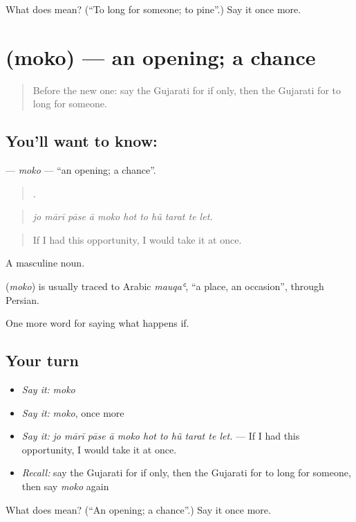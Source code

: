 \begin{tcolorbox}[breakable,colback=teal!4,colframe=teal!35!black,title={Before you move on}]
What does  mean? (\textquotedblleft{}To long for someone; to pine\textquotedblright{}.) Say it once more.
\end{tcolorbox}
\section[\texorpdfstring{\gu{મોકો} (moko)}{મોકો (moko)}]{ (moko) — an opening; a chance}

\label{lesson:GU-C381-moko}



\begin{quote}
Before the new one: say the Gujarati for if only, then the Gujarati for to long for someone.
\end{quote}

\subsection*{You'll want to know: }
\textbf{} — \emph{moko} — \textquotedblleft{}an opening; a chance\textquotedblright{}.

\begin{quote}
          .
\end{quote}

\begin{quote}
\emph{jo mārī pāse ā moko hot to hũ tarat te let.}
\end{quote}

\begin{quote}
If I had this opportunity, I would take it at once.
\end{quote}

A masculine noun.

\begin{cousinweb}
\textbf{} (\emph{moko}) is usually traced to Arabic \emph{mauqaʿ}, \textquotedblleft{}a place, an occasion\textquotedblright{}, through Persian.
\end{cousinweb}

\begin{grammarlens}[title={What you've built}]
One more word for saying what happens if.
\end{grammarlens}

\subsection*{Your turn}
\begin{itemize}
\raggedright
  \item \emph{Say it:} \emph{moko}
  \item \emph{Say it:} \emph{moko}, once more
  \item \emph{Say it:} \emph{jo mārī pāse ā moko hot to hũ tarat te let.} — If I had this opportunity, I would take it at once.
  \item \emph{Recall:} say the Gujarati for if only, then the Gujarati for to long for someone, then say \emph{moko} again
\end{itemize}

\begin{tcolorbox}[breakable,colback=teal!4,colframe=teal!35!black,title={Before you move on}]
What does  mean? (\textquotedblleft{}An opening; a chance\textquotedblright{}.) Say it once more.
\end{tcolorbox}

